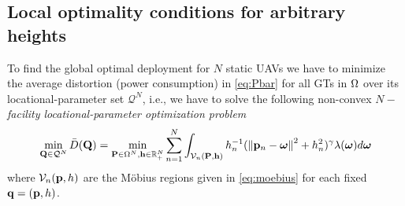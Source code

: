 \documentclass[smallabstract,smallcaptions]{dccpaper}
\newcommand{\df}{\ensuremath{\lam}}         %
\newcommand{\bH}{\ensuremath{\vh}}          %
\newcommand{\Vor}{\ensuremath{\mathcal{V}}}         %
\newcommand{\Qset}{\ensuremath{\mathcal Q}}
\newcommand{\Dis}{\ensuremath{D}}                    %
\newcommand{\AvDis}{\ensuremath{\bar{\Dis}}}         %
\begin{document}
\subsection{Local optimality conditions for arbitrary heights}
%
To find the global optimal deployment for $N$ static UAVs we have to minimize the average distortion (power consumption)
in \eqref{eq:Pbar}  for all GTs in $\Omega$ over its locational-parameter set $\Qset^N$, i.e., we have to solve the following
non-convex \emph{$N-$facility locational-parameter optimization problem} \cite{GJ, GJcom18, GJ18,WJ18} 
%
\begin{align}
  \min_{\vQ\in\Qset^N} \AvDis(\vQ)= \min_{\vP\in\Omega^N,\bH\in \R_+^N} \sum_{n=1}^{N} \int_{\Vor_n(\vP,\bH)}
  h_n^{-1}(\Norm{\vp_n-\vome}^2 +h_n^2)^{\gam}\df(\vome)d\vome\label{eq:phoptlocal} 
\end{align}
%
where $\Vor_n(\vp,h)$ are the Möbius regions given in \eqref{eq:moebius} for each fixed ${\mathbf q}=({\mathbf p},h)$.
\end{document}
